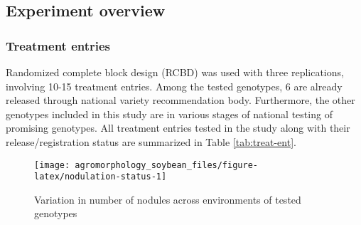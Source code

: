 \documentclass[
]{article}
\begin{document}
\hypertarget{experiment-overview}{%
\subsection{Experiment overview}\label{experiment-overview}}

\hypertarget{treatment-entries}{%
\subsubsection{Treatment entries}\label{treatment-entries}}

Randomized complete block design (RCBD) was used with three replications, involving 10-15 treatment entries. Among the tested genotypes, 6 are already released through national variety recommendation body. Furthermore, the other genotypes included in this study are in various stages of national testing of promising genotypes. All treatment entries tested in the study along with their release/registration status are summarized in Table \ref{tab:treat-ent}.

\begin{figure}

{\centering \texttt{[image: agromorphology\_soybean\_files/figure-latex/nodulation-status-1]} 

}

\caption{Variation in number of nodules across environments of tested genotypes}\label{fig:nodulation-status}
\end{figure}
\end{document}
